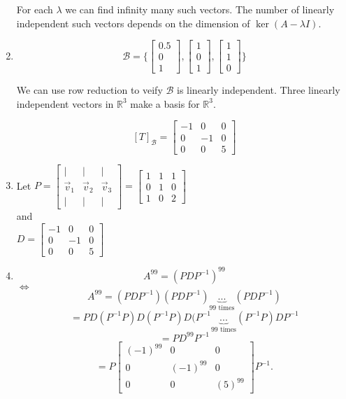 \begin{SaveQuestion}
\begin{enumerate}
		For each $\lambda$ we can find infinity many such vectors. The number of linearly independent such vectors depends on the dimension of $\ker (A-\lambda I)$.
        \item $$\mathcal{B}=\{\begin{bmatrix} 0.5  \\ 0 \\ 1 \end{bmatrix}, \begin{bmatrix} 1  \\ 0 \\ 1 \end{bmatrix} , \begin{bmatrix} 1  \\ 1 \\ 0 \end{bmatrix}\}$$
		
We can use row reduction to veify $\mathcal B$ is linearly independent. Three linearly independent vectors in $\mathbb{R}^3$ make a basis for $\mathbb{R}^3$. 
		
		$$[T]_\mathcal B=\begin{bmatrix} -1 & 0 & 0 \\ 0 & -1 & 0 \\ 0 & 0 & 5 \end{bmatrix}$$
        \item Let $P=\begin{bmatrix} | & | & | \\ \vec{v}_1 & \vec{v}_2 & \vec{v}_3 \\ | & | & | \end{bmatrix}=\begin{bmatrix} 1 & 1 & 1 \\ 0 & 1 & 0 \\ 1 & 0 & 2 \end{bmatrix}$\\
		and\\
		$D=\begin{bmatrix} -1 & 0 & 0 \\ 0 & -1 & 0 \\ 0 & 0 & 5 \end{bmatrix}$
        \item $$ A^{99}=(PDP^{-1})^{99}$$
		$\Leftrightarrow$
		$$ A^{99}=(PDP^{-1})(PDP^{-1})\underbrace{...}_{\text{99 times}}(PDP^{-1})$$
		$$ =PD(P^{-1}P)D(P^{-1}P)D(P^{-1}\underbrace{...}_{\text{99 times}}(P^{-1}P)DP^{-1}$$
		$$=PD^{99}P^{-1}$$
		$$=P\begin{bmatrix} (-1)^{99} & 0 & 0 \\ 0 & (-1)^{99} & 0 \\ 0 & 0 & (5)^{99} \end{bmatrix}P^{-1}.$$
    \end{enumerate}
\end{SaveQuestion}

